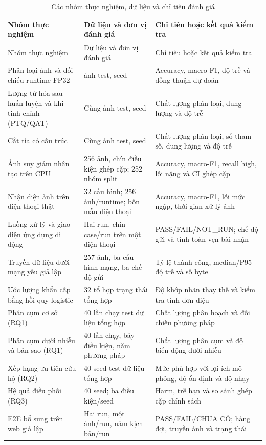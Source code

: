 \begin{longtable}{P{.28\textwidth}P{.30\textwidth}P{.31\textwidth}}
\caption{Các nhóm thực nghiệm, dữ liệu và chỉ tiêu đánh giá}\label{tab:experiment-map}\\
\toprule Nhóm thực nghiệm & Dữ liệu và đơn vị đánh giá & Chỉ tiêu hoặc kết quả kiểm tra \\\midrule\endfirsthead
\toprule Nhóm thực nghiệm & Dữ liệu và đơn vị đánh giá & Chỉ tiêu hoặc kết quả kiểm tra \\\midrule\endhead
Phân loại ảnh và đối chiếu runtime FP32 & \ImageTest{} ảnh test, seed \BenchmarkSeed{} & Accuracy, macro-F1, độ trễ và đồng thuận dự đoán \\
Lượng tử hóa sau huấn luyện và khi tinh chỉnh (PTQ/QAT) & Cùng \ImageTest{} ảnh test, seed \QuantizationSeed{} & Chất lượng phân loại, dung lượng và độ trễ \\
Cắt tỉa có cấu trúc & Cùng \ImageTest{} ảnh test, seed \PruningSeed{} & Chất lượng phân loại, số tham số, dung lượng và độ trễ \\
Ảnh suy giảm nhân tạo trên CPU & 256 ảnh, chín điều kiện ghép cặp; 252 nhóm split & Accuracy, macro-F1, recall high, lỗi nặng và CI ghép cặp \\
Nhận diện ảnh trên điện thoại thật & 32 cấu hình; 256 ảnh/runtime; bốn mẫu điện thoại & Accuracy, macro-F1, lỗi mức ngập, thời gian xử lý ảnh \\
Luồng xử lý và giao diện ứng dụng di động & Hai run, chín case/run trên một điện thoại & PASS/FAIL/NOT\_RUN; chế độ gửi và tính toàn vẹn bài nhận \\
Truyền dữ liệu dưới mạng yếu giả lập & 257 ảnh, ba cấu hình mạng, ba chế độ gửi & Tỷ lệ thành công, median/P95 độ trễ và số byte \\
Ước lượng khẩn cấp bằng hồi quy logistic & 32 tổ hợp trạng thái tổng hợp & Độ khớp nhãn thay thế và kiểm tra tính đơn điệu \\
Phân cụm cơ sở (RQ1) & 40 lần chạy test dữ liệu tổng hợp & Chất lượng phân hoạch và đối chiếu phương pháp \\
Phân cụm dưới nhiễu và bản sao (RQ1) & 40 lần chạy, bảy điều kiện, năm phương pháp & Chất lượng phân cụm và độ biến động dưới nhiễu \\
Xếp hạng ưu tiên cứu hộ (RQ2) & 40 seed test dữ liệu tổng hợp & Mức phù hợp với lợi ích mô phỏng, độ ổn định và độ nhạy \\
Hệ quả điều phối (RQ3) & 40 seed; ba điều kiện/seed & Harm, trễ hạn và so sánh ghép cặp chính sách \\
E2E bổ sung trên web giả lập & Hai run, một ảnh/run, năm kịch bản/run & PASS/FAIL/CHƯA CÓ; hàng đợi, truyền ảnh và trạng thái \\
\bottomrule
\end{longtable}


